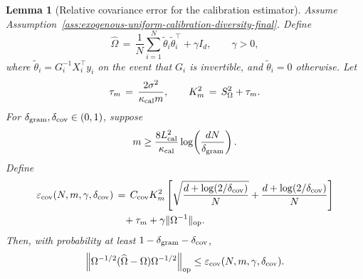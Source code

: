 \documentclass{article} %
\newtheorem{lemma}[theorem]{Lemma}
\begin{document}
\begin{lemma}[Relative covariance error for the calibration estimator]
\label{lem:relative-covariance-error-final}
Assume Assumption~\ref{ass:exogenous-uniform-calibration-diversity-final}.
Define
\begin{equation}
\widehat\Omega
\,=\,
\frac1N\sum_{i=1}^N \widetilde\theta_i\widetilde\theta_i^\top+\gamma I_d,
\qquad
\gamma>0,
\end{equation}
where \(\widetilde\theta_i=G_i^{-1}X_i^\top y_i\) on the event that \(G_i\) is
invertible, and \(\widetilde\theta_i=0\) otherwise.  Let
\begin{equation}
\tau_m
\,=\,
\frac{2\sigma^2}{\kappa_{\rm cal}m},
\qquad
K_m^2
\,=\,
S_\Omega^2+\tau_m.
\end{equation}
For
\(\delta_{\rm gram},\delta_{\rm cov}\in(0,1)\), suppose
\begin{equation}
m
\geq
\frac{8L_{\rm cal}^2}{\kappa_{\rm cal}}
\log\!\left(\frac{dN}{\delta_{\rm gram}}\right).
\end{equation}
Define
\begin{equation}
\begin{aligned}
\varepsilon_{\rm cov}(N,m,\gamma,\delta_{\rm cov})
&\,=\,
C_{\rm cov}K_m^2\left[
\sqrt{\frac{d+\log(2/\delta_{\rm cov})}{N}}
+
\frac{d+\log(2/\delta_{\rm cov})}{N}
\right]
\\
&\quad
+
\tau_m
+
\gamma\|\Omega^{-1}\|_{\mathrm{op}}.
\end{aligned}
\end{equation}
Then, with probability at least \(1-\delta_{\rm gram}-\delta_{\rm cov}\),
\begin{equation}
\left\|
\Omega^{-1/2}(\widehat\Omega-\Omega)\Omega^{-1/2}
\right\|_{\mathrm{op}}
\leq
\varepsilon_{\rm cov}(N,m,\gamma,\delta_{\rm cov}).
\end{equation}
\end{lemma}
\end{document}

